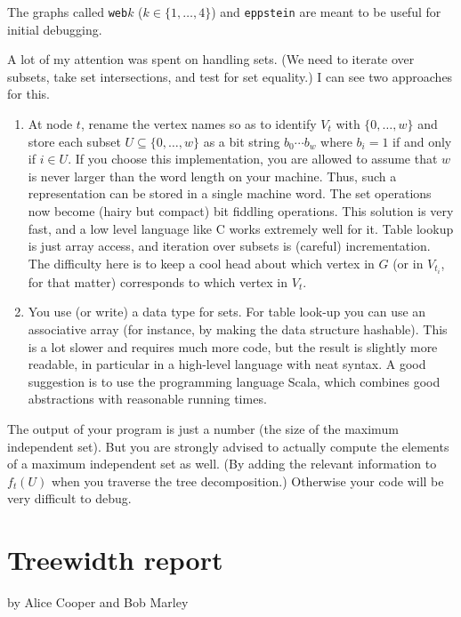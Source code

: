 \documentclass{tufte-handout}
\begin{document}
The graphs called {\tt web$k$} ($k\in\{1,\ldots,4\}$) and {\tt eppstein} are meant to be useful for initial debugging.

A lot of my attention was spent on handling sets.
(We need to iterate over subsets, take set intersections, and test for set equality.)
I can see two approaches for this.
\begin{enumerate}
  \item At node $t$, rename the vertex names so as to identify $V_t$ with $\{0,\ldots, w\}$ and store each subset $U\subseteq \{0,\ldots,w\}$ as a bit string $b_0\cdots b_w$ where $b_i=1$ if and only if $i\in U$.
    If you choose this implementation, you are allowed to assume that $w$ is never larger than the word length on your machine.
    Thus, such a representation can be stored in a single machine word.
    The set operations now become (hairy but compact) bit fiddling operations.
    This solution is very fast, and a low level language like C works extremely well for it.
    Table lookup is just array access, and iteration over subsets is (careful) incrementation.
    The difficulty here is to keep a cool head about which vertex in $G$ (or in $V_{t_i}$, for that matter) corresponds to which vertex in $V_t$.
  \item You use (or write) a data type for sets.
    For table look-up you can use an associative array (for instance, by making the data structure hashable).
      This is a lot slower and requires much more code, but the result is slightly more readable, in particular in a high-level language with neat syntax.
      A good suggestion is to use the programming language Scala, which combines good abstractions with reasonable running times.
\end{enumerate}

The output of your program is just a number (the size of the maximum independent set).
But you are strongly advised to actually compute the elements of a maximum independent set as well.
(By adding the relevant information to $f_t(U)$ when you traverse the tree decomposition.)
Otherwise your code will be very difficult to debug.

\newpage
\section{Treewidth report}


by Alice Cooper and Bob Marley
\end{document}
